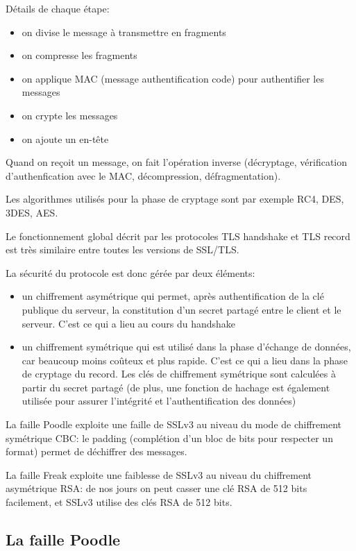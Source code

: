 Détails de chaque étape:
\begin{itemize}
\item on divise le message à transmettre en fragments 
\item on compresse les fragments
\item on applique MAC (message authentification code) pour authentifier les messages 
\item on crypte les messages
\item on ajoute un en-t\^ete
\end{itemize}
Quand on reçoit un message, on fait l'opération inverse (décryptage, vérification d'authenfication avec le MAC, décompression, défragmentation). 

Les algorithmes utilisés pour la phase de cryptage sont par exemple RC4, DES, 3DES, AES. 

Le fonctionnement global décrit par les protocoles TLS handshake et TLS record est très similaire entre toutes les versions de SSL/TLS. 


La sécurité du protocole est donc gérée par deux éléments:
\begin{itemize}
\item un chiffrement asymétrique qui permet, après authentification de la clé publique du serveur, la constitution d'un secret partagé entre le client et le serveur. C'est ce qui a lieu au cours du handshake
\item un chiffrement symétrique qui est utilisé dans la phase d'échange de données, car beaucoup moins coûteux et plus rapide. C'est ce qui a lieu dans la phase de cryptage du record. Les clés de chiffrement symétrique sont calculées à partir du secret partagé (de plus, une fonction de hachage est également utilisée pour assurer l'intégrité et l'authentification des données)
\end{itemize}

La faille Poodle exploite une faille de SSLv3 au niveau du mode de chiffrement symétrique CBC: le padding (complétion d'un bloc de bits pour respecter un format) permet de déchiffrer des messages. 


La faille Freak exploite une faiblesse de SSLv3 au niveau du chiffrement asymétrique RSA: de nos jours on peut casser une clé RSA de 512 bits facilement, et SSLv3 utilise des clés RSA de 512 bits.

\subsection{La faille Poodle}
